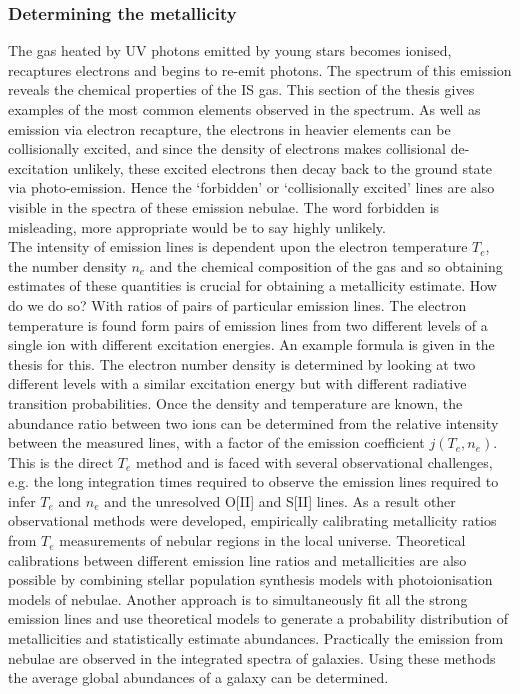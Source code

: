 \documentclass{literature}
\begin{document}
\subsubsection{Determining the metallicity}\label{subs:determining the metallicity}
The gas heated by UV photons emitted by young stars becomes ionised, recaptures electrons and begins to re-emit photons. The spectrum of this emission reveals the chemical properties of the IS gas. This section of the thesis gives examples of the most common elements observed in the spectrum. As well as emission via electron recapture, the electrons in heavier elements can be collisionally excited, and since the density of electrons makes collisional de-excitation unlikely, these excited electrons then decay back to the ground state via photo-emission. Hence the `forbidden' or `collisionally excited' lines are also visible in the spectra of these emission nebulae. The word forbidden is misleading, more appropriate would be to say highly unlikely. \\ 
The intensity of emission lines is dependent upon the electron temperature $T_{e}$, the number density $n_{e}$ and the chemical composition of the gas and so obtaining estimates of these quantities is crucial for obtaining a metallicity estimate. How do we do so? With ratios of pairs of particular emission lines. The electron temperature is found form pairs of emission lines from two different levels of a single ion with different excitation energies. An example formula is given in the thesis for this. The electron number density is determined by looking at two different levels with a similar excitation energy but with different radiative transition probabilities. Once the density and temperature are known, the abundance ratio between two ions can be determined from the relative intensity between the measured lines, with a factor of the emission coefficient $j(T_{e}, n_{e})$. This is the direct $T_{e}$ method and is faced with several observational challenges, e.g. the long integration times required to observe the emission lines required to infer $T_{e}$ and $n_{e}$ and the unresolved O[II] and S[II] lines. As a result other observational methods were developed, empirically calibrating metallicity ratios from $T_{e}$ measurements of nebular regions in the local universe. Theoretical calibrations between different emission line ratios and metallicities are also possible by combining stellar population synthesis models with photoionisation models of nebulae. Another approach is to simultaneously fit all the strong emission lines and use theoretical models to generate a probability distribution of metallicities and statistically estimate abundances. Practically the emission from nebulae are observed in the integrated spectra of galaxies. Using these methods the average global abundances of a galaxy can be determined. 
\end{document}
